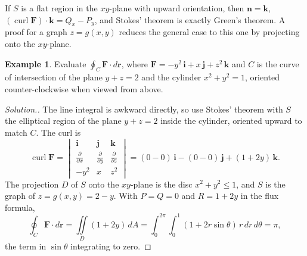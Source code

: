 \documentclass[11pt,a4paper]{article}
\DeclareMathOperator{\curl}{curl}
\theoremstyle{definition}
\newtheorem{exa}[thm]{Example}
\newenvironment{solution}
  {\renewcommand{\qedsymbol}{}\begin{proof}[\textit{Solution}.]}
  {\end{proof}}
\begin{document}
If $S$ is a flat region in the $xy$-plane with upward orientation, then
$\mathbf n = \mathbf k$, $(\curl\mathbf F)\cdot\mathbf k = Q_x - P_y$, and
Stokes' theorem is exactly Green's theorem. A proof for a graph $z = g(x,y)$
reduces the general case to this one by projecting onto the $xy$-plane.

\begin{exa}
\label{ex:stokes}
Evaluate $\oint_C \mathbf F\cdot d\mathbf r$, where $\mathbf F = -y^2\,\mathbf i
+ x\,\mathbf j + z^2\,\mathbf k$ and $C$ is the curve of intersection of the
plane $y + z = 2$ and the cylinder $x^2 + y^2 =1$, oriented counter-clockwise
when viewed from above.

\begin{figure}[H]
\centering
{}
\end{figure}
\end{exa}

\begin{solution}
The line integral is awkward directly, so use Stokes' theorem with $S$ the
elliptical region of the plane $y + z = 2$ inside the cylinder, oriented upward
to match $C$. The curl is
\[\curl \mathbf F = \begin{vmatrix}
\mathbf i & \mathbf j & \mathbf k\\[1ex]
\frac{\partial}{\partial x} & \frac{\partial}{\partial y} & \frac{\partial}
{\partial z}\\[1ex]
-y^2 & x & z^2
\end{vmatrix} = (0 - 0)\,\mathbf i - (0 - 0)\,\mathbf j + (1 + 2y)\,\mathbf k .\]
The projection $D$ of $S$ onto the $xy$-plane is the disc $x^2 + y^2 \leq 1$, and
$S$ is the graph of $z = g(x,y) = 2 - y$. With $P = Q = 0$ and $R = 1 + 2y$ in
the flux formula,
\[\oint_C \mathbf F\cdot d \mathbf r = \iint\limits_D (1 + 2y)\,dA = \int^{2\pi}_0
\int^{1}_0( 1 + 2r\sin \theta )\, r\, dr\, d\theta = \pi ,\]
the term in $\sin\theta$ integrating to zero.
\end{solution}
\end{document}
